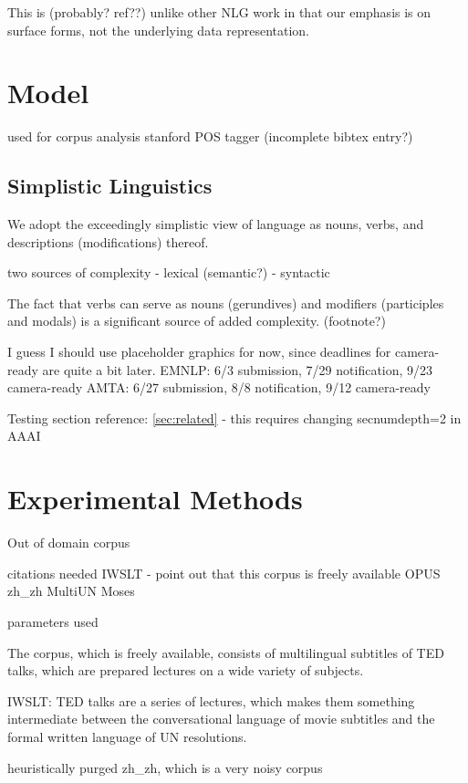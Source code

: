 This is (probably? ref??) unlike other NLG work in that our emphasis is on surface forms, not the underlying data representation.


\section{Model}

used for corpus analysis stanford POS tagger (incomplete bibtex entry?) 

\subsection{Simplistic Linguistics}
We adopt the exceedingly simplistic view of language as nouns, verbs, and descriptions (modifications) thereof.

two sources of complexity
- lexical (semantic?)
- syntactic 

The fact that verbs can serve as nouns (gerundives) and modifiers (participles and modals) is a significant source of added complexity. (footnote?)


I guess I should use placeholder graphics for now, since deadlines for camera-ready are quite a bit later.
EMNLP: 6/3 submission, 7/29 notification, 9/23 camera-ready
AMTA: 6/27 submission, 8/8 notification, 9/12 camera-ready

Testing section reference: \ref{sec:related} - this requires changing secnumdepth=2 in AAAI

\section{Experimental Methods}

Out of domain corpus

citations needed
IWSLT - point out that this corpus is freely available
OPUS zh\_zh
MultiUN
Moses

parameters used

The corpus, which is freely available, consists of multilingual subtitles of TED talks, which are prepared lectures on a wide variety of subjects.

IWSLT: TED talks are a series of lectures, which makes them something intermediate between the conversational language of movie subtitles and the formal written language of UN resolutions.



heuristically purged zh\_zh, which is a very noisy corpus

